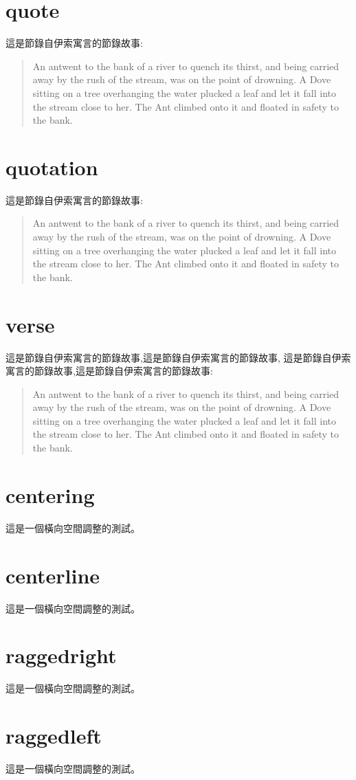 \documentclass{article}
\begin{document}
\begin{CJK}{UTF8}{bsmi}
\section{quote}
這是節錄自伊索寓言的節錄故事:
\begin{quote}
An antwent to the bank of a river to quench its thirst, and
being carried away by the rush of the stream, was on the
point of drowning.
A Dove sitting on a tree overhanging the water plucked a
leaf and let it fall into the stream close to her. The Ant
climbed onto it and floated in safety to the bank.
\end{quote}
\section{quotation}
這是節錄自伊索寓言的節錄故事:
\begin{quotation}
An antwent to the bank of a river to quench its thirst, and
being carried away by the rush of the stream, was on the
point of drowning.
A Dove sitting on a tree overhanging the water plucked a
leaf and let it fall into the stream close to her. The Ant
climbed onto it and floated in safety to the bank.
\end{quotation}
\section{verse}
這是節錄自伊索寓言的節錄故事,這是節錄自伊索寓言的節錄故事,%
這是節錄自伊索寓言的節錄故事,這是節錄自伊索寓言的節錄故事:
\begin{verse}
An antwent to the bank of a river to quench its thirst, and
being carried away by the rush of the stream, was on the
point of drowning.
A Dove sitting on a tree overhanging the water plucked a
leaf and let it fall into the stream close to her. The Ant
climbed onto it and floated in safety to the bank.
\end{verse}
\section{centering}
\centering
這是一個橫向空間調整的測試。\\ %
\raggedright
\section{centerline}
\centerline{這是一個橫向空間調整的測試。}
\section{raggedright}
\raggedright
這是一個橫向空間調整的測試。
\section{raggedleft}
\raggedleft
這是一個橫向空間調整的測試。
\end{CJK}
\end{document}
